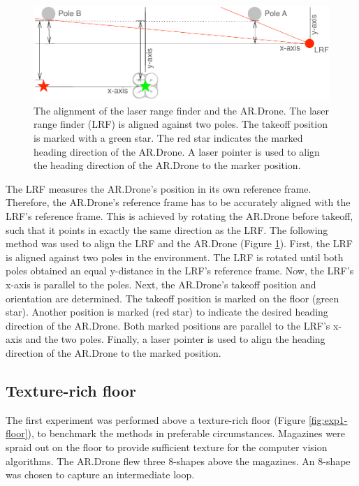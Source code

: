 \begin{figure}[htb]
\centering
\includegraphics[width=13cm]{images/exp1-floorplan-align.pdf}
\caption{The alignment of the laser range finder and the AR.Drone. The laser range finder (LRF) is aligned against two poles. The takeoff position is marked with a green star. The red star indicates the marked heading direction of the AR.Drone. A laser pointer is used to align the heading direction of the AR.Drone to the marker position.}
\label{fig:exp1-floorplan-align}
\end{figure}

The LRF measures the AR.Drone's position in its own reference frame.
Therefore, the AR.Drone's reference frame has to be accurately aligned with the LRF's reference frame.
This is achieved by rotating the AR.Drone before takeoff, such that it points in exactly the same direction as the LRF.
The following method was used to align the LRF and the AR.Drone (Figure \ref{fig:exp1-floorplan-align}).
First, the LRF is aligned against two poles in the environment.
The LRF is rotated until both poles obtained an equal y-distance in the LRF's reference frame.
Now, the LRF's x-axis is parallel to the poles.
Next, the AR.Drone's takeoff position and orientation are determined.
The takeoff position is marked on the floor (green star).
Another position is marked (red star) to indicate the desired heading direction of the AR.Drone.
Both marked positions are parallel to the LRF's x-axis and the two poles.
Finally, a laser pointer is used to align the heading direction of the AR.Drone to the marked position.





\subsection{Texture-rich floor}
\label{sec:exp1-texture-rich}
The first experiment was performed above a texture-rich floor (Figure \ref{fig:exp1-floor}), to benchmark the methods in preferable circumstances.
Magazines were spraid out on the floor to provide sufficient texture for the computer vision algorithms.
The AR.Drone flew three 8-shapes above the magazines.
An 8-shape was chosen to capture an intermediate loop.

